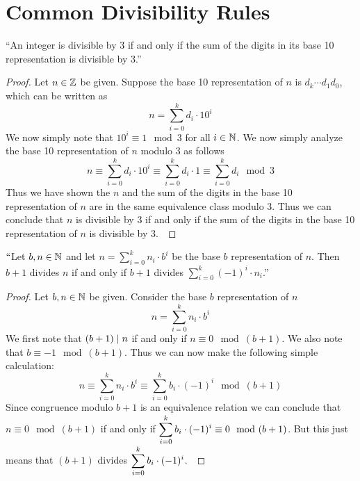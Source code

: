     \section{Common Divisibility Rules}
        \begin{theorem}
            ``An integer is divisible by $3$ if and only if the sum of the digits in its base 10
            representation is divisible by $3$.''
        \end{theorem}
        \begin{proof}
            Let $n \in \mathbb{Z}$ be given. Suppose the base 10 representation of $n$ is
            $d_k \cdots d_1 d_0$, which can be written as
            \[
                n = \sum_{i = 0}^{k} d_i \cdot 10^i
            \]
            We now simply note that $10^i \equiv 1 \mod 3$ for all $i \in \mathbb{N}$. We now simply
            analyze the base 10 representation of $n$ modulo 3 as follows
            \[
                n \equiv \sum_{i = 0}^{k} d_i \cdot 10^i \equiv \sum_{i = 0}^{k} d_i \cdot 1 \equiv \sum_{i = 0}^{k} d_i \mod 3
            \]
            Thus we have shown the $n$ and the sum of the digits in the base 10 representation of
            $n$ are in the same equivalence class modulo 3. Thus we can conclude that $n$
            is divisible by 3 if and only if the sum of the digits in the base 10 representation of $n$
            is divisible by 3.~\QED
        \end{proof}
        \begin{theorem}
            $``$Let $b, n \in \mathbb{N}$ and let $n = \sum_{i = 0}^{k} n_i \cdot b^i$ be the base
            $b$ representation of $n$. Then $b + 1$ divides $n$ if and only if $b + 1$ divides
            $\sum_{i = 0}^{k} (-1)^{i} \cdot n_i$.''
        \end{theorem}
        \begin{proof}
            Let $b, n \in \mathbb{N}$ be given. Consider the base $b$ representation of $n$
            \[
                n = \sum_{i = 0}^{k} n_i \cdot b^i
            \]
            We first note that $(b + 1) \mid n$ if and only if $n \equiv 0 \mod (b + 1)$.
            We also note that $b \equiv -1 \mod (b + 1)$. Thus we can now make the following
            simple calculation:
            \[
                n \equiv \sum_{i = 0}^{k} n_i \cdot b^i \equiv  \sum_{i = 0}^{k} b_i \cdot (-1)^i \mod (b + 1)
            \]
            Since congruence modulo $b + 1$ is an equivalence relation we can conclude that
            $n \equiv 0 \mod (b + 1)$ if and only if $\displaystyle\sum_{i = 0}^{k} b_i \cdot (-1)^i \equiv 0 \mod (b + 1)$.
            But this just means that $(b + 1)$ divides ${\displaystyle\sum_{i = 0}^{k} b_i \cdot (-1)^i}$.~\QED
        \end{proof}
